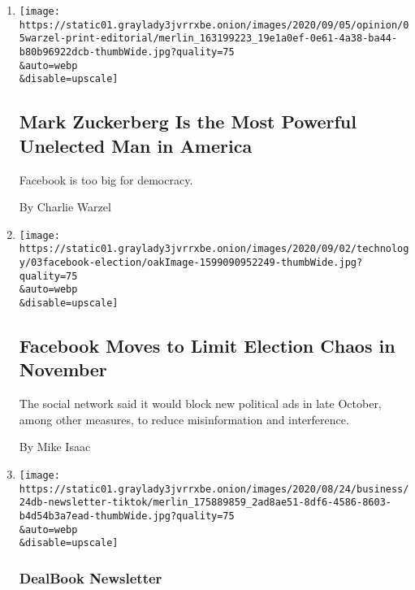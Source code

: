 \begin{enumerate}
\def\labelenumi{\arabic{enumi}.}
\item
  \href{/2020/09/03/opinion/facebook-zuckerberg-2020-election.html}{}

  \texttt{[image: https://static01.graylady3jvrrxbe.onion/images/2020/09/05/opinion/05warzel-print-editorial/merlin\_163199223\_19e1a0ef-0e61-4a38-ba44-b80b96922dcb-thumbWide.jpg?quality=75\\\&auto=webp\\\&disable=upscale]}

  \hypertarget{mark-zuckerberg-is-the-most-powerful-unelected-man-in-america}{%
  \subsection{Mark Zuckerberg Is the Most Powerful Unelected Man in
  America}\label{mark-zuckerberg-is-the-most-powerful-unelected-man-in-america}}

  Facebook is too big for democracy.

  By Charlie Warzel
\item
  \href{/2020/09/03/technology/facebook-election-chaos-november.html}{}

  \texttt{[image: https://static01.graylady3jvrrxbe.onion/images/2020/09/02/technology/03facebook-election/oakImage-1599090952249-thumbWide.jpg?quality=75\\\&auto=webp\\\&disable=upscale]}

  \hypertarget{facebook-moves-to-limit-election-chaos-in-november}{%
  \subsection{Facebook Moves to Limit Election Chaos in
  November}\label{facebook-moves-to-limit-election-chaos-in-november}}

  The social network said it would block new political ads in late
  October, among other measures, to reduce misinformation and
  interference.

  By Mike Isaac
\item
  \href{/2020/08/24/business/dealbook/tiktok-trump-lawsuit.html}{}

  \texttt{[image: https://static01.graylady3jvrrxbe.onion/images/2020/08/24/business/24db-newsletter-tiktok/merlin\_175889859\_2ad8ae51-8df6-4586-8603-b4d54b3a7ead-thumbWide.jpg?quality=75\\\&auto=webp\\\&disable=upscale]}

  \hypertarget{dealbook-newsletter}{%
  \subsubsection{DealBook Newsletter}\label{dealbook-newsletter}}


\end{enumerate}
